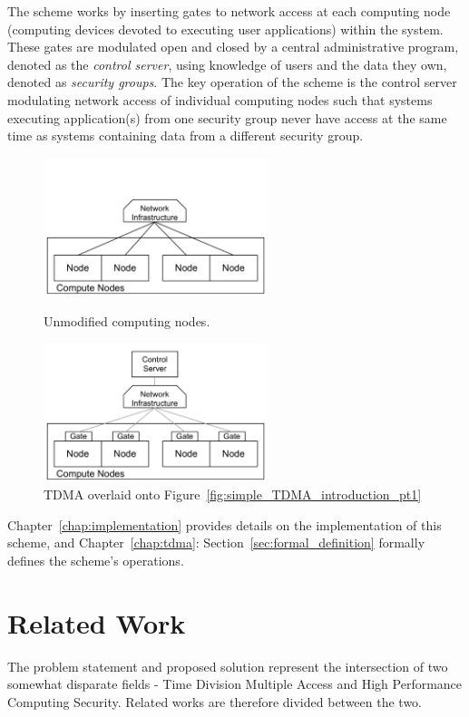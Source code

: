 \documentclass[oneside,12pt]{memoir}
\begin{document}
The scheme works by inserting gates to network access at each computing node (computing devices devoted to executing user applications) within the system. These gates are modulated open and closed by a central administrative program, denoted as the \textit{control server}, using knowledge of users and the data they own, denoted as \textit{security groups}. The key operation of the scheme is the control server modulating network access of individual computing nodes such that systems executing application(s) from one security group never have access at the same time as systems containing data from a different security group.

\begin{figure}
\centering
\begin{minipage}{6.5cm}
\includegraphics[width=6.5cm]{Simple_TDMA_Introduction_pt1.pdf}
\caption{Unmodified computing nodes.}
\label{fig:simple_TDMA_introduction_pt1}
\end{minipage}
\hspace{1em}
\begin{minipage}{6.5cm}
\includegraphics[width=6.5cm]{Simple_TDMA_Introduction_pt2.pdf}
\caption{TDMA overlaid onto Figure~\ref{fig:simple_TDMA_introduction_pt1}}
\label{fig:simple_TDMA_introduction_pt2}
\end{minipage}
\end{figure}

Chapter~\ref{chap:implementation} provides details on the implementation of this scheme, and Chapter~\ref{chap:tdma}: Section~\ref{sec:formal_definition} formally defines the scheme's operations.
\chapter{Related Work}
The problem statement and proposed solution represent the intersection of two somewhat disparate fields - Time Division Multiple Access and High Performance Computing Security. Related works are therefore divided between the two. 
\end{document}
